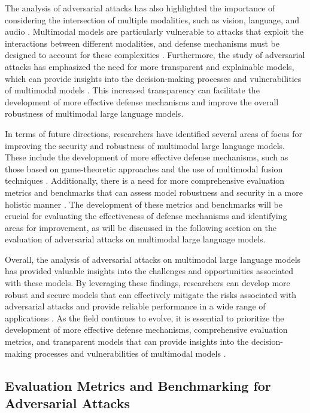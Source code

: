 \documentclass[11pt,a4paper]{article}
\begin{document}
The analysis of adversarial attacks has also highlighted the importance of considering the intersection of multiple modalities, such as vision, language, and audio \cite{arxiv:2404.11865}. Multimodal models are particularly vulnerable to attacks that exploit the interactions between different modalities, and defense mechanisms must be designed to account for these complexities \cite{arxiv:2508.14264}. Furthermore, the study of adversarial attacks has emphasized the need for more transparent and explainable models, which can provide insights into the decision-making processes and vulnerabilities of multimodal models \cite{arxiv:2412.02104}. This increased transparency can facilitate the development of more effective defense mechanisms and improve the overall robustness of multimodal large language models.

In terms of future directions, researchers have identified several areas of focus for improving the security and robustness of multimodal large language models. These include the development of more effective defense mechanisms, such as those based on game-theoretic approaches \cite{arxiv:2406.11839} and the use of multimodal fusion techniques \cite{arxiv:2402.14891}. Additionally, there is a need for more comprehensive evaluation metrics and benchmarks that can assess model robustness and security in a more holistic manner \cite{arxiv:2408.15769}. The development of these metrics and benchmarks will be crucial for evaluating the effectiveness of defense mechanisms and identifying areas for improvement, as will be discussed in the following section on the evaluation of adversarial attacks on multimodal large language models. 

Overall, the analysis of adversarial attacks on multimodal large language models has provided valuable insights into the challenges and opportunities associated with these models. By leveraging these findings, researchers can develop more robust and secure models that can effectively mitigate the risks associated with adversarial attacks and provide reliable performance in a wide range of applications \cite{arxiv:2408.11039}. As the field continues to evolve, it is essential to prioritize the development of more effective defense mechanisms, comprehensive evaluation metrics, and transparent models that can provide insights into the decision-making processes and vulnerabilities of multimodal models \cite{arxiv:2407.12580}.


\subsection{Evaluation Metrics and Benchmarking for Adversarial Attacks}
\end{document}

